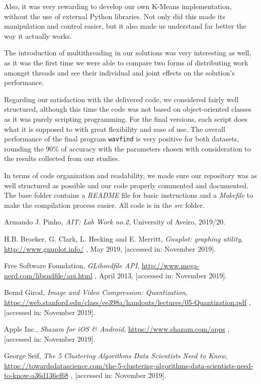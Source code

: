 \documentclass[12pt]{article}
\begin{document}
Also, it was very rewarding to develop our own K-Means implementation, without 
the use of external Python libraries. 
Not only did this made its manipulation and control easier, but it also made us 
understand far better the way it actually works.

The introduction of multithreading in our solutions was very interesting as well,
as it was the first time we were able to compare two forms of distributing work
amongst threads and see their individual and joint effects on the solution's 
performance.

Regarding our satisfaction with the delivered code, we considered fairly well 
structured, although this time the code was not based on object-oriented classes
as it was purely scripting programming.
For the final versions, each script does what it is supposed to with great 
flexibility and ease of use.
The overall performance of the final program \texttt{wavfind} is very positive for both
datasets, rounding the 90\% of accuracy with the parameters chosen with 
consideration to the results collected from our studies.

In terms of code organization and readability, we made sure our 
repository was as well structured as possible and our code properly commented
and documented.
The base folder contains a {\it README\/} file for basic instructions and a 
{\it Makefile\/} to make the compilation process easier.
All code is in the {\it src\/} folder.

\newpage
\begin{thebibliography}{9}
  

    Armando J. Pinho,
    \textit{AIT: Lab Work no.2},
    University of Aveiro,
    2019/20.
  
    H.B. Broeker, G. Clark, L. Hecking and E. Merritt,
    \textit{Gnuplot: graphing utility},
    \url{http://www.gnuplot.info/} ,
    May 2019,
    [accessed in: November 2019].

    Free Software Foundation,
    \textit{GLibsndfile API},
    \url{http://www.mega-nerd.com/libsndfile/api.html} ,
    April 2013,
    [accessed in: November 2019].

    Bernd Girod,
    \textit{Image and Video Compression: Quantization},
    \url{https://web.stanford.edu/class/ee398a/handouts/lectures/05-Quantization.pdf} ,
    [accessed in: November 2019].

    Apple Inc.,
    \textit{Shazam for iOS \& Android},
    \url{https://www.shazam.com/apps} ,
    [accessed in: November 2019].

    George Seif,
    \textit{The 5 Clustering Algorithms Data Scientists Need to Know},
    \url{https://towardsdatascience.com/the-5-clustering-algorithms-data-scientists-need-to-know-a36d136ef68} ,
    [accessed in: November 2019].

\end{thebibliography}

\clearpage
\end{document}

